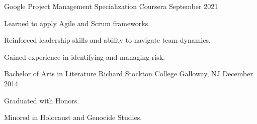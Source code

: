 

\begin{cventries}

  \cventry
    {Google Project Management Specialization} %
    {Coursera} %
    {} %
    {September 2021} %
    {
      \begin{cvitems} %
        \item {Learned to apply Agile and Scrum frameworks.}
        \item {Reinforced leadership skills and ability to navigate team dynamics.}
        \item {Gained experience in identifying and managing risk.}
      \end{cvitems}
    }
  \cventry
    {Bachelor of Arts in Literature} %
    {Richard Stockton College} %
    {Galloway, NJ} %
    {December 2014} %
    {
      \begin{cvitems} %
        \item {Graduated with Honors.}
        \item {Minored in Holocaust and Genocide Studies.}
      \end{cvitems}
    }

\end{cventries}
